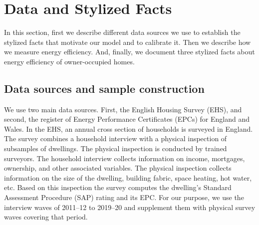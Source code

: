 %
\section{Data and Stylized Facts}\label{sec:data}

In this section, first we describe different data sources we use to establish the stylized facts that motivate our model and to calibrate it. Then we describe how we measure energy efficiency. And, finally, we document three stylized facts about energy efficiency of owner-occupied homes.


\subsection{Data sources and sample construction}\label{sec:data-sources}

We use two main data sources. First, the English Housing Survey (EHS), and second, the register of Energy Performance Certificates (EPCs) for England and Wales. In the EHS, an annual cross section of households is surveyed in England. The survey combines a household interview with a physical inspection of subsamples of dwellings. The physical inspection is conducted by trained surveyors. The household interview collects information on income, mortgages, ownership, and other associated variables. The physical inspection collects information on the size of the dwelling, building fabric, space heating, hot water, etc. Based on this inspection the survey computes the dwelling's Standard Assessment Procedure (SAP) rating and its EPC.  For our purpose, we use the interview waves of 2011--12 to 2019--20 and supplement them with physical survey waves covering that period.


